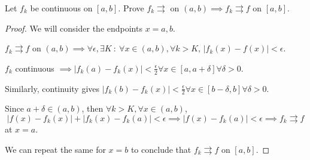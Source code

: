 \documentclass[../hw3]{subfiles}
\begin{document}
\begin{problem}
Let $f_k$ be continuous on  $[a,b]$.
Prove $f_k \rightrightarrows$ on $(a,b) \implies f_k \rightrightarrows f$ on $[a,b]$.
\end{problem}
\begin{proof}
	We will consider the endpoints $x=a,b$.

	$f_k \rightrightarrows f$ on $(a,b) \implies \forall \epsilon, \exists K\ :\ \forall x \in (a,b), \forall k>K,\, |f_k(x)-f(x)|<\epsilon$.

	$f_k$ continuous  $\implies |f_k(a)-f_k(x)|<\frac{\epsilon}{2} \forall x \in [a,a+\delta] \forall \delta>0$.

	Similarly, continuity gives $|f_k(b)-f_k(x)|<\frac{\epsilon}{2} \forall x \in [b-\delta,b] \forall \delta>0$.

	Since $a+\delta \in  (a,b)$, then $\forall k > K, \forall x \in  (a,b)$, \[
		|f(x)-f_k(x)|+|f_k(x)-f_k(a)|<\epsilon \implies |f(x)-f_k(a)|<\epsilon \implies f_k \rightrightarrows f
	\] at $x=a$.

	We can repeat the same for  $x=b$ to conclude that  $f_k \rightrightarrows f$ on $[a,b]$.
\end{proof}
\end{document}
